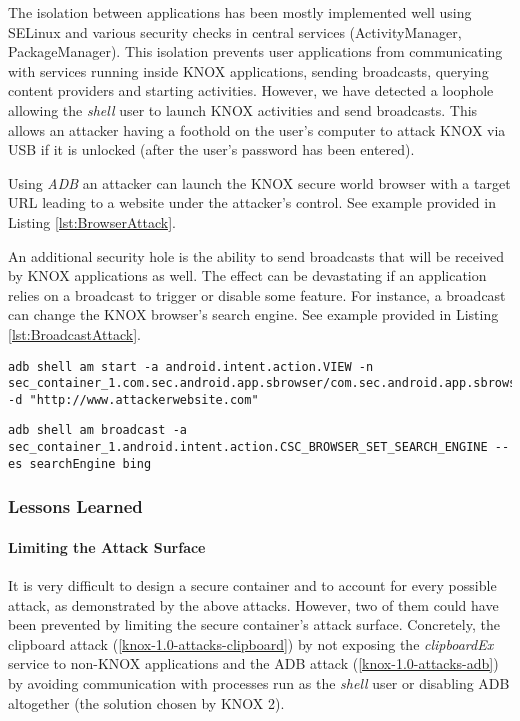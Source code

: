 \documentclass[11pt]{article}
\begin{document}
The isolation between applications has been mostly implemented well using SELinux and various security checks in central services 
(ActivityManager, PackageManager).
This isolation prevents user applications from communicating with services running inside KNOX applications, sending broadcasts, querying content 
providers and starting activities.
However, we have detected a loophole allowing the \emph{shell} user to launch KNOX activities and send broadcasts. 
This allows an attacker having a foothold on the user's computer to attack KNOX via USB if it is unlocked (after the user's password has been entered). 

Using \emph{ADB} an attacker can launch the KNOX secure world browser with a target URL leading to a website under the attacker's control. 
See example provided in Listing \ref{lst:BrowserAttack}.

An additional security hole is the ability to send broadcasts that will be received by KNOX applications as well.
The effect can be devastating if an application relies on a broadcast to trigger or disable some feature.
For instance, a broadcast can change the KNOX browser's search engine. 
See example provided in Listing \ref{lst:BroadcastAttack}.

\begin{lstlisting}[breaklines=true, caption={Launching Browser from ADB}, label={lst:BrowserAttack}]
adb shell am start -a android.intent.action.VIEW -n sec_container_1.com.sec.android.app.sbrowser/com.sec.android.app.sbrowser.SBrowserMainActivity -d "http://www.attackerwebsite.com"
\end{lstlisting}

\begin{lstlisting}[breaklines=true, caption={Sending Broadcasts from ADB}, label={lst:BroadcastAttack}]
adb shell am broadcast -a sec_container_1.android.intent.action.CSC_BROWSER_SET_SEARCH_ENGINE --es searchEngine bing
\end{lstlisting}

\subsubsection{Lessons Learned}
\paragraph{Limiting the Attack Surface}
It is very difficult to design a secure container and to account for every possible attack, as demonstrated by the 
above attacks. However, two of them could have been prevented by limiting the secure container's attack surface.
Concretely, the clipboard attack (\ref{knox-1.0-attacks-clipboard}) by not exposing the \emph{clipboardEx} service to non-KNOX applications and 
the ADB attack (\ref{knox-1.0-attacks-adb}) by avoiding communication with processes run as the \emph{shell} user 
or disabling ADB altogether (the solution chosen by KNOX 2).
\end{document}
